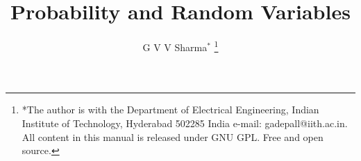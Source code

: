 \documentclass[journal,12pt,twocolumn]{IEEEtran}
\begin{document}
\let\StandardTheFigure\thefigure
\let\vec\mathbf
\renewcommand{\thefigure}{\theproblem}



\def\putbox#1#2#3{\makebox[0in][l]{\makebox[#1][l]{}\raisebox{\baselineskip}[0in][0in]{\raisebox{#2}[0in][0in]{#3}}}}
     \def\rightbox#1{\makebox[0in][r]{#1}}
     \def\centbox#1{\makebox[0in]{#1}}
     \def\topbox#1{\raisebox{-\baselineskip}[0in][0in]{#1}}
     \def\midbox#1{\raisebox{-0.5\baselineskip}[0in][0in]{#1}}

\vspace{3cm}

\title{
Probability and Random Variables
}
\author{ G V V Sharma$^{*}$%
	\thanks{*The author is with the Department
		of Electrical Engineering, Indian Institute of Technology, Hyderabad
		502285 India e-mail:  gadepall@iith.ac.in. All content in this manual is released under GNU GPL.  Free and open source.}
	
}	


%
%
%

% 
%
\end{document}
